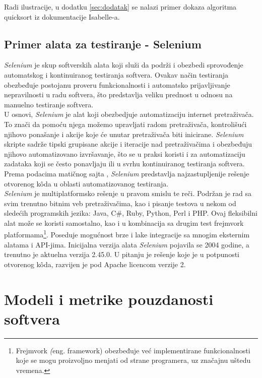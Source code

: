 \documentclass[a4paper]{article}
\begin{document}
Radi ilustracije, u dodatku \ref{sec:dodatak} se nalazi primer dokaza algoritma quicksort iz dokumentacije Isabelle-a.


\subsection{Primer alata za testiranje - Selenium}
\label{subsec:primer_alata}
\emph{Selenium} je skup softverskih alata koji služi da podrži i obezbedi sprovođenje automatskog i kontinuiranog testiranja softvera. Ovakav način testiranja obezbeđuje postojanu proveru funkcionalnosti i automatsko prijavljivanje nepravilnosti u radu softvera, što predstavlja veliku prednost u odnosu na manuelno testiranje softvera.\\

U osnovi, \emph{Selenium} je alat koji obezbedjuje automatizaciju internet pretraživača. To znači da pomoću njega možemo upravljati radom pretraživača, kontrolišući njihovo ponašanje i akcije koje će unutar pretraživača biti inicirane. \emph{Selenium} skripte sadrže tipski grupisane akcije i iteracije nad pretraživačima i obezbeđuju njihovo automatizovano izvršavanje, što se u praksi koristi i za automatizaciju zadataka koji se često ponavljaju ili u svrhu kontinuiranog testiranja softvera. Prema podacima matičnog sajta \cite{Selenium}, \emph{Selenium} predstavlja najzastupljenije rešenje otvorenog  k\^{o}da u oblasti automatizovanog testiranja.\\

\emph{Selenium} je multiplatformsko rešenje u pravom smislu te reči. Podržan je rad sa svim trenutno bitnim veb pretraživačima, kao i pisanje testova u nekom od sledećih programskih jezika: Java, C\#, Ruby, Python, Perl i PHP. Ovaj fleksibilni alat može se koristi samostalno, kao i u kombinacija sa drugim test frejmvork platformama\footnote{ Frejmvork \emph(eng. framework) obezbeđuje već implementirane funkcionalnosti koje se mogu proizvoljno menjati od strane programera, uz značajnu uštedu vremena.}. Poseduje mogućnost brze i lake integracije sa mnogim eksternim alatama i API-jima. Inicijalna verzija alata \emph{Selenium} pojavila se 2004 godine, a trenutno je aktuelna verzija 2.45.0. U pitanju je rešenje koje je u potpunosti otvorenog  k\^{o}da, razvijen je pod Apache licencom verzije 2.

\section{Modeli i metrike pouzdanosti softvera}	
\label{sec:modeli_metrike}
\end{document}
